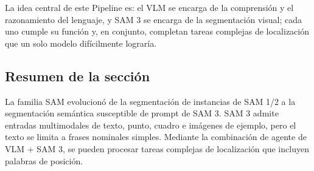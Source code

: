 La idea central de este Pipeline es: el VLM se encarga de la comprensión y el razonamiento del lenguaje, y SAM 3 se encarga de la segmentación visual; cada uno cumple su función y, en conjunto, completan tareas complejas de localización que un solo modelo difícilmente lograría.

\subsection{Resumen de la sección}

La familia SAM evolucionó de la segmentación de instancias de SAM 1/2 a la segmentación semántica susceptible de prompt de SAM 3. SAM 3 admite entradas multimodales de texto, punto, cuadro e imágenes de ejemplo, pero el texto se limita a frases nominales simples. Mediante la combinación de agente de VLM + SAM 3, se pueden procesar tareas complejas de localización que incluyen palabras de posición.
